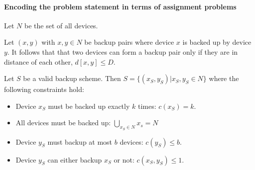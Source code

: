 
\paragraph{Encoding the problem statement in terms of assignment problems}

Let $N$ be the set of all devices.

Let $(x, y)$ with $ x, y \in N$ be backup pairs where device $x$ is backed up by device $y$. It follows that that two devices can form a backup pair only if they are in distance of each other, $d[x, y] \leq D$.

Let $S$ be a valid backup scheme. Then $S = \{(x_S, y_S) | x_S, y_S \in N \}$ where the following constraints hold:

\begin{itemize}

\item Device $x_S$ must be backed up exactly $k$ times: $c(x_S) = k$.

\item All devices must be backed up: $\bigcup_{x_S \in N} x_s = N $

\item Device $y_S$ must backup at most $b$ devices: $c(y_S) \leq b$.

\item Device $y_S$ can either backup $x_S$ or not: $c(x_S, y_S) \leq 1$.

\end{itemize}




